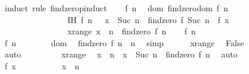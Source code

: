 \begin{isabellebody}
\begin{figure}
\begin{minipage}{0.8\textwidth}
%
\isadelimproof
%
\endisadelimproof
%
\isatagproof
{}\isamarkupfalse%
\ {\isacharparenleft}induct\ rule{\isacharcolon}\ findzero{\isachardot}pinduct{\isacharparenright}\isanewline
\ \ \isamarkupfalse%
\ f\ n\ \isamarkupfalse%
\ dom{\isacharcolon}\ {\isachardoublequoteopen}findzero{\isacharunderscore}dom\ {\isacharparenleft}f{\isacharcomma}\ n{\isacharparenright}{\isachardoublequoteclose}\isanewline
\ \ \ \ \ \ \ \ \ \ \ \ \ \ \ \ IH{\isacharcolon}\ {\isachardoublequoteopen}{\isasymlbrakk}f\ n\ {\isasymnoteq}\ {}{\isacharsemicolon}\ x\ {\isasymin}\ {\isacharbraceleft}Suc\ n\ {\isachardot}{\isachardot}{\isacharless}\ findzero\ f\ {\isacharparenleft}Suc\ n{\isacharparenright}{\isacharbraceright}{\isasymrbrakk}\ {\isasymLongrightarrow}\ f\ x\ {\isasymnoteq}\ {}{\isachardoublequoteclose}\isanewline
\ \ \ \ \ \ \ \ \ \ \ \ \ \ \ \ x{\isacharunderscore}range{\isacharcolon}\ {\isachardoublequoteopen}x\ {\isasymin}\ {\isacharbraceleft}n\ {\isachardot}{\isachardot}{\isacharless}\ findzero\ f\ n{\isacharbraceright}{\isachardoublequoteclose}\isanewline
\ \ \isamarkupfalse%
\ {\isachardoublequoteopen}f\ n\ {\isasymnoteq}\ {}{\isachardoublequoteclose}\isanewline
\ \ \isamarkupfalse%
\ \isanewline
\ \ \ \ \isamarkupfalse%
\ {\isachardoublequoteopen}f\ n\ {\isacharequal}\ {}{\isachardoublequoteclose}\isanewline
\ \ \ \ \isamarkupfalse%
\ dom\ \isamarkupfalse%
\ {\isachardoublequoteopen}findzero\ f\ n\ {\isacharequal}\ n{\isachardoublequoteclose}\ \isamarkupfalse%
\ simp\isanewline
\ \ \ \ \isamarkupfalse%
\ x{\isacharunderscore}range\ \isamarkupfalse%
\ False\ \isamarkupfalse%
\ auto\isanewline
\ \ \isamarkupfalse%
\isanewline
\ \ \isanewline
\ \ \isamarkupfalse%
\ x{\isacharunderscore}range\ \isamarkupfalse%
\ {\isachardoublequoteopen}x\ {\isacharequal}\ n\ {\isasymor}\ x\ {\isasymin}\ {\isacharbraceleft}Suc\ n\ {\isachardot}{\isachardot}{\isacharless}\ findzero\ f\ n{\isacharbraceright}{\isachardoublequoteclose}\ \isamarkupfalse%
\ auto\isanewline
\ \ \isamarkupfalse%
\ {\isachardoublequoteopen}f\ x\ {\isasymnoteq}\ {}{\isachardoublequoteclose}\isanewline
\ \ \isamarkupfalse%
\isanewline
\ \ \ \ \isamarkupfalse%
\ {\isachardoublequoteopen}x\ {\isacharequal}\ n{\isachardoublequoteclose}\isanewline

\end{minipage}
\end{figure}
\end{isabellebody}
